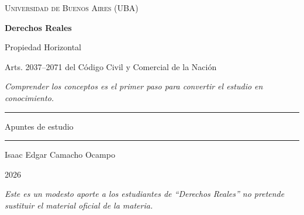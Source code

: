 \documentclass[12pt,oneside]{book}
\newcommand{\universidad}{Universidad de Buenos Aires (UBA)}
\newcommand{\materia}{Derechos Reales}
\newcommand{\titulo}{Propiedad Horizontal}
\newcommand{\subtitulo}{Arts. 2037--2071 del Código Civil y Comercial de la Nación}
\newcommand{\autor}{Isaac Edgar Camacho Ocampo}
\newcommand{\anio}{2026}
\begin{document}
\begin{titlepage}

\thispagestyle{empty}

\begin{center}

\vspace*{1cm}

{\large \textsc{\universidad}}

\vspace{3cm}

{\Huge \textbf{\materia}}

\vspace{1cm}

{\LARGE \titulo}

\vspace{0.3cm}

{\normalsize \subtitulo}

\vspace{0.8cm}

\textit{Comprender los conceptos es el primer paso para convertir el estudio en conocimiento.}

\vspace{1.2cm}

\rule{0.70\textwidth}{0.5pt}

\vspace{0.5cm}

{\large Apuntes de estudio}

\vspace{0.5cm}

\rule{0.70\textwidth}{0.5pt}

\vfill

{\large \autor}

\vspace{0.3cm}

{\large \anio}

\end{center}

\vfill

\begin{flushleft}
\textit{Este es un modesto aporte a los estudiantes de ``\materia'' no pretende sustituir el material oficial de la materia.}
\end{flushleft}

\end{titlepage}

\tableofcontents
\end{document}
